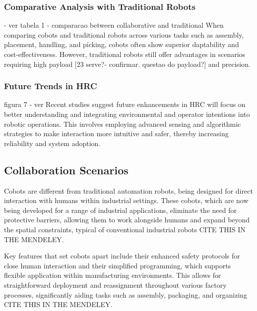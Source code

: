 \subsubsection{Comparative Analysis with Traditional Robots}

- ver tabela 1 - comparacao between collaborative and traditional
When comparing cobots and traditional robots across various tasks such as assembly, placement, handling, and picking, cobots often show superior 
daptability and cost-effectiveness. However, traditional robots still offer advantages in scenarios requiring high payload [23 serve?- confirmar. 
questao do payload?] and precision. 

\subsubsection{Future Trends in \ac{HRC}}
figura 7 - ver
Recent studies suggest future enhancements in HRC will focus on better understanding and integrating environmental and operator intentions into robotic 
operations. This involves employing advanced sensing and algorithmic strategies to make interaction more intuitive and safer, thereby increasing 
reliability and system adoption.



\subsection{Collaboration Scenarios} 

Cobots are different from traditional automation robots, being designed for direct interaction with humans within industrial settings. 
These cobots, which are now being developed for a range of industrial applications, eliminate the need for protective barriers, allowing them to 
work alongside humans and expand beyond the spatial constraints, typical of conventional industrial robots \cite{Kadir2018} CITE THIS IN THE MENDELEY.

Key features that set cobots apart include their enhanced safety protocols for close human interaction and their simplified programming, 
which supports flexible application within manufacturing environments. This allows for straightforward deployment and reassignment throughout 
various factory processes, significantly aiding tasks such as assembly, packaging, and organizing \cite{Faccio2019} CITE THIS IN THE MENDELEY.

